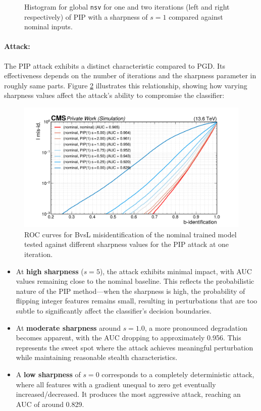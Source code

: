 \begin{figure}[htbp]
  \caption{Histogram for global \texttt{nsv} for one and two iterations (left and right respectively) of PIP with a sharpness of $s=1$ compared against nominal inputs.}
  \label{fig:intprob_severity_vtxAss}
\end{figure}

\newpage
\paragraph{Attack:} The PIP attack exhibits a distinct characteristic compared to PGD. Its effectiveness depends on the number of iterations and the sharpness parameter in roughly same parts. Figure \ref{fig:intprob_rocs_vs_sharpness} illustrates this relationship, showing how varying sharpness values affect the attack's ability to compromise the classifier:

\begin{figure}[H]
\centering
    \includegraphics[width=15cm]{media/output/roc_bvsl_intprob_sharpness.pdf}
    \caption{ROC curves for BvsL misidentification of the nominal trained model tested against different sharpness values for the PIP attack at one iteration.}
    \label{fig:intprob_rocs_vs_sharpness}
\end{figure}

\begin{itemize}
    \item At \textbf{high sharpness} ($s = 5$), the attack exhibits minimal impact, with AUC values remaining close to the nominal baseline. This reflects the probabilistic nature of the PIP method—when the sharpness is high, the probability of flipping integer features remains small, resulting in perturbations that are too subtle to significantly affect the classifier's decision boundaries.
    \item At \textbf{moderate sharpness} around $s = 1.0$, a more pronounced degradation becomes apparent, with the AUC dropping to approximately 0.956. This represents the sweet spot where the attack achieves meaningful perturbation while maintaining reasonable stealth characteristics. 
    \item A \textbf{low sharpness} of $s = 0$ corresponds to a completely deterministic attack, where all features with a gradient unequal to zero get eventually increased/decreased. It produces the most aggressive attack, reaching an AUC of around 0.829.
\end{itemize}


